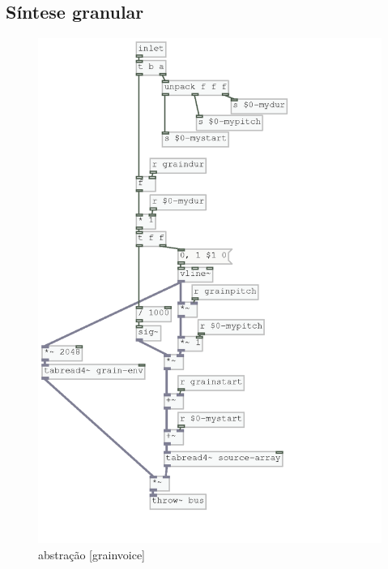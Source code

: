 \documentclass{ppgmus}
\begin{document}

\subsection{Síntese granular}




\begin{figure}
\includegraphics[scale=.6]{granular2}
\caption{abstração [grainvoice]}
\label{granular2}
\end{figure}
\end{document}
